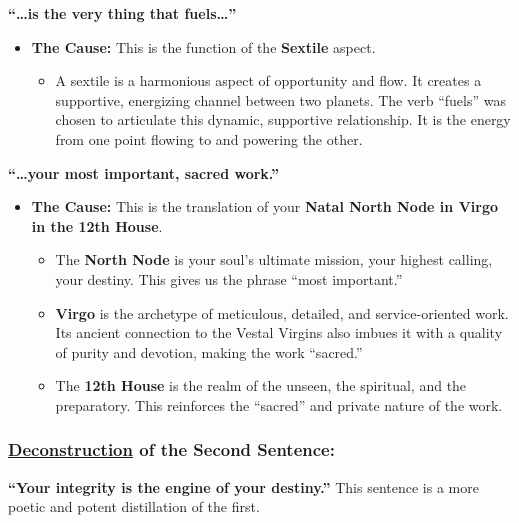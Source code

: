 \documentclass{article}
\begin{document}
\textbf{``\ldots is the very thing that fuels\ldots{}''}

\begin{itemize}
\tightlist
\item
  \textbf{The Cause:} This is the function of the \textbf{Sextile} aspect.

  \begin{itemize}
  \tightlist
  \item
    A sextile is a harmonious aspect of opportunity and flow. It creates a supportive, energizing channel between two planets. The verb ``fuels'' was chosen to articulate this dynamic, supportive relationship. It is the energy from one point flowing to and powering the other.
  \end{itemize}
\end{itemize}

\textbf{``\ldots your most important, sacred work.''}

\begin{itemize}
\tightlist
\item
  \textbf{The Cause:} This is the translation of your \textbf{Natal North Node in Virgo in the 12th House}.

  \begin{itemize}
  \tightlist
  \item
    The \textbf{North Node} is your soul's ultimate mission, your highest calling, your destiny. This gives us the phrase ``most important.''
  \item
    \textbf{Virgo} is the archetype of meticulous, detailed, and service-oriented work. Its ancient connection to the Vestal Virgins also imbues it with a quality of purity and devotion, making the work ``sacred.''
  \item
    The \textbf{12th House} is the realm of the unseen, the spiritual, and the preparatory. This reinforces the ``sacred'' and private nature of the work.
  \end{itemize}
\end{itemize}

\subsubsection*{\hyperlink{gloss:deconstruction}{Deconstruction} of the Second Sentence:}\label{deconstruction-of-the-second-sentence}

\textbf{``Your integrity is the engine of your destiny.''} This sentence is a more poetic and potent distillation of the first.
\end{document}
